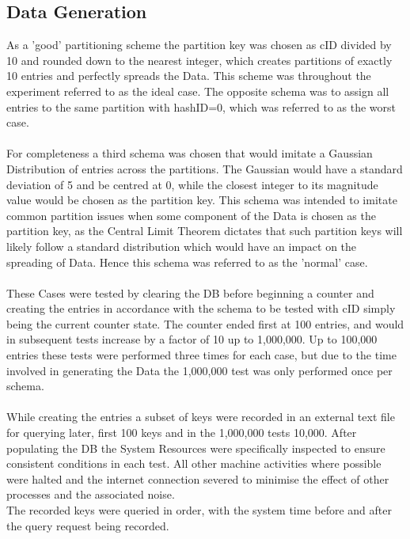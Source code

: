 \documentclass{template/csfourzero}
\begin{document}
  \subsection{Data Generation}
  As a 'good' partitioning scheme the partition key was chosen as cID divided by 10 and rounded down to the nearest integer, which creates partitions of exactly 10 entries and perfectly spreads the Data. This scheme was throughout the experiment referred to as the ideal case.
  The opposite schema was to assign all entries to the same partition with hashID=0, which was referred to as the worst case.
  \\
  \\
  For completeness a third schema was chosen that would imitate a Gaussian Distribution of entries across the partitions. The Gaussian would have a standard deviation of 5 and be centred at 0, while the closest integer to its magnitude value would be chosen as the partition key. This schema was intended to imitate common partition issues when some component of the Data is chosen as the partition key, as the Central Limit Theorem dictates that such partition keys will likely follow a standard distribution which would have an impact on the spreading of Data. \cite{centLimit} Hence this schema was referred to as the 'normal' case. 
  \\
  \\
  These Cases were tested by clearing the DB before beginning a counter and creating the entries in accordance with the schema to be tested with cID simply being the current counter state. The counter ended first at 100 entries, and would in subsequent tests increase by a factor of 10 up to 1,000,000. Up to 100,000 entries these tests were performed three times for each case, but due to the time involved in generating the Data the 1,000,000 test was only performed once per schema.
  \\
  \\
  While creating the entries a subset of keys were recorded in an external text file for querying later, first 100 keys and in the 1,000,000 tests 10,000. After populating the DB the System Resources were specifically inspected to ensure consistent conditions in each test. All other machine activities where possible were halted and the internet connection severed to minimise the effect of other processes and the associated noise.
  \\
  The recorded keys were queried in order, with the system time before and after the query request being recorded.
\end{document}
